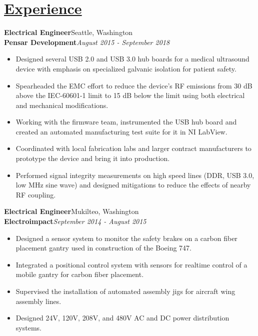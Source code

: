 \documentclass[a4paper, 11pt]{article}
\begin{document}
\section{\underline{Experience}}
  \textbf{Electrical Engineer}\hfill Seattle, Washington\\
  \textbf{Pensar Development}\hfill \emph{August 2015 - September 2018}\smallskip
  \begin{itemize}[nosep]
    \item Designed several USB 2.0 and USB 3.0 hub boards for a medical ultrasound device with emphasis on specialized galvanic isolation for patient safety.
    \item Spearheaded the EMC effort to reduce the device's RF emissions from 30 dB above the IEC-60601-1 limit to 15 dB below the limit using both electrical and mechanical modifications.
    \item Working with the firmware team, instrumented the USB hub board and created an automated manufacturing test suite for it in NI LabView.
    \item Coordinated with local fabrication labs and larger contract manufacturers to prototype the device and bring it into production.
    \item Performed signal integrity measurements on high speed lines (DDR, USB 3.0, low MHz sine wave) and designed mitigations to reduce the effects of nearby RF coupling.
  \end{itemize}
  \medskip
  
  \textbf{Electrical Engineer}\hfill Mukilteo, Washington\\
  \textbf{Electroimpact}\hfill \emph{September 2014 - August 2015}\smallskip
  \begin{itemize}[nosep]
    \item Designed a sensor system to monitor the safety brakes on a carbon fiber placement gantry used in construction of the Boeing 747.
    \item  Integrated a positional control system with sensors for realtime control of a mobile gantry for carbon fiber placement.
    \item Supervised the installation of automated assembly jigs for aircraft wing assembly lines.
    \item Designed 24V, 120V, 208V, and 480V AC and DC power distribution systems.
  \end{itemize}
  \medskip    
   
\end{document}
